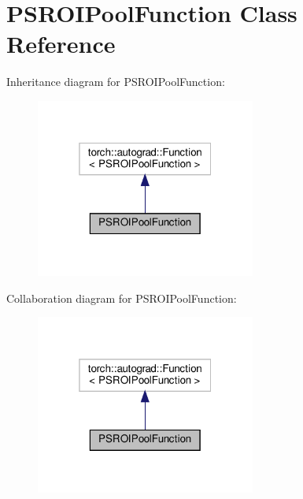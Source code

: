 \hypertarget{classPSROIPoolFunction}{}\section{P\+S\+R\+O\+I\+Pool\+Function Class Reference}
\label{classPSROIPoolFunction}


Inheritance diagram for P\+S\+R\+O\+I\+Pool\+Function\+:
\nopagebreak
\begin{figure}[H]
\begin{center}
\leavevmode
\includegraphics[width=205pt]{classPSROIPoolFunction__inherit__graph}
\end{center}
\end{figure}


Collaboration diagram for P\+S\+R\+O\+I\+Pool\+Function\+:
\nopagebreak
\begin{figure}[H]
\begin{center}
\leavevmode
\includegraphics[width=205pt]{classPSROIPoolFunction__coll__graph}
\end{center}
\end{figure}
